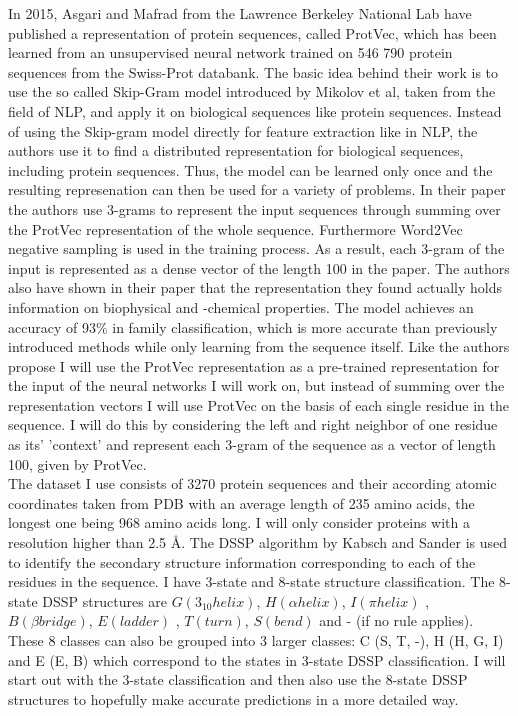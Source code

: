 \documentclass{article}
\begin{document}
In 2015, Asgari and Mafrad from the Lawrence Berkeley National Lab have published a representation of protein sequences, called ProtVec, which has been learned from an unsupervised neural network trained on 546 790 protein sequences from the Swiss-Prot databank. The basic idea behind their work is to use the so called Skip-Gram model introduced by Mikolov et al, taken from the field of NLP, and apply it on biological sequences like protein sequences. Instead of using the Skip-gram model directly for feature extraction like in NLP, the authors use it to find a distributed representation for biological sequences, including protein sequences. Thus, the model can be learned only once and the resulting represenation can then be used for a variety of problems. In their paper the authors use 3-grams to represent the input sequences through summing over the ProtVec representation of the whole sequence. Furthermore Word2Vec negative sampling is used in the training process. As a result, each 3-gram of the input is represented as a dense vector of the length 100 in the paper. The authors also have shown in their paper that the representation they found actually holds information on biophysical and -chemical properties. The model achieves an accuracy of 93\% in family classification, which is more accurate than previously introduced methods while only learning from the sequence itself. Like the authors propose I will use the ProtVec representation as a pre-trained representation for the input of the neural networks I will work on, but instead of summing over the representation vectors I will use ProtVec on the basis of each single residue in the sequence. I will do this by considering the left and right neighbor of  one residue as its' 'context' and represent each 3-gram of the sequence as a vector of length 100, given by ProtVec.\\

The dataset I use consists of 3270 protein sequences and their according atomic coordinates taken from PDB with an average length of 235 amino acids, the longest one being 968 amino acids long. I will only consider proteins with a resolution higher than 2.5 Å. The DSSP algorithm by Kabsch and Sander is used to identify the secondary structure information corresponding to each of the residues in the sequence. I have 3-state and 8-state structure classification. The 8-state DSSP structures are $G (3_{10} helix)$, $H (\alpha helix)$, $I (\pi helix)$ , $B (\beta bridge)$, $E (ladder)$ , $T (turn)$, $S (bend)$ and - (if no rule applies). These 8 classes can also be grouped into 3 larger classes: C (S, T, -), H (H, G, I) and E (E, B) which correspond to the states in 3-state DSSP classification. I will start out with the 3-state classification and then also use the 8-state DSSP structures to hopefully make accurate predictions in a more detailed way.\\
\end{document}
